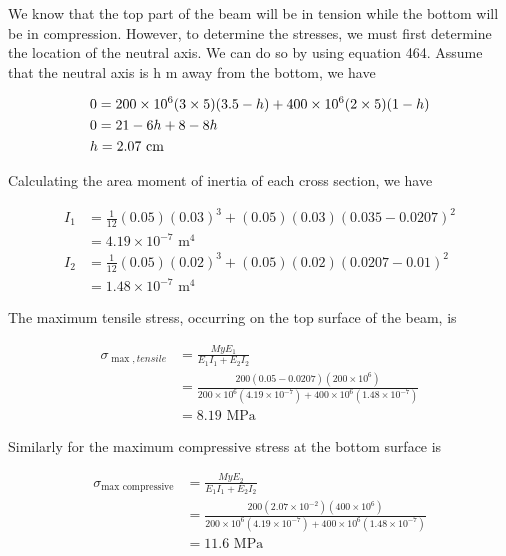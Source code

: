 \documentclass[
10pt,
a4paper,
openany,
svgnames,
]{kaobook} %
\begin{document}
\begin{solution}
We know that the top part of the beam will be in tension while the bottom will be in compression. However, to determine the stresses, we must first determine the location of the neutral axis. We can do so by using equation 464. Assume that the neutral axis is h m away from the bottom, we have

\[\begin{gathered}
  0 = 200 \times {10^6}(3 \times 5)(3.5 - h) + 400 \times {10^6}(2 \times 5)(1 - h) \hfill \\
  0 = 21 - 6h + 8 - 8h \hfill \\
  h = 2.07 \text{ cm} \hfill \\ 
\end{gathered} \]

  Calculating the area moment of inertia of each cross section, we have

  \begin{align*}
    I_1 &= \frac{1}{12}(0.05)(0.03)^3 + (0.05)(0.03)(0.035 - 0.0207)^{2} \\
        &= 4.19 \times 10^{-7} \text{ m}^4 \\
    I_2 &= \frac{1}{12}(0.05)(0.02)^3 + (0.05)(0.02)(0.0207 - 0.01)^{2} \\
        &= 1.48 \times 10^{ -7} \text{ m}^4
    \end{align*}

The maximum tensile stress, occurring on the top surface of the beam, is

\begin{align*}
  \sigma_{\max,tensile} &= \frac{MyE_1}{E_1I_1 + E_2I_2} \\
                             &= \frac{200(0.05 - 0.0207)(200 \times 10^6)}{200 \times 10^6(4.19 \times 10^{-7}) + 400 \times 10^6(1.48 \times 10^{ -7})} \\
                             &= 8.19 \text{ MPa}
\end{align*}

Similarly for the maximum compressive stress at the bottom surface is

\begin{align*}
  \sigma_{\max \text{ compressive}} &= \frac{MyE_2}{E_1I_1 + E_2I_2} \\
                                 &= \frac{200(2.07 \times 10^{ - 2})(400 \times 10^6)}{200 \times 10^6(4.19 \times 10^{-7}) + 400 \times 10^6(1.48 \times 10^{-7})} \\
                                 &= 11.6 \text{ MPa}
\end{align*}

\end{solution}
\end{document}
